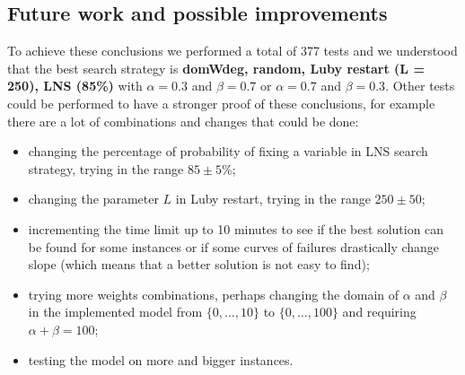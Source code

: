 \documentclass[../main.tex]{subfiles}
\begin{document}
\subsection{Future work and possible improvements}
To achieve these conclusions we performed a total of 377 tests and we understood that the best search strategy is \textbf{domWdeg, random, Luby restart (L = 250), LNS (85\%)} with $\alpha = 0.3$ and $\beta = 0.7$ or $\alpha = 0.7$ and $\beta = 0.3$. Other tests could be performed to have a stronger proof of these conclusions, for example there are a lot of combinations and changes that could be done:
\begin{itemize}
    \item changing the percentage of probability of fixing a variable in LNS search strategy, trying in the range $85 \pm 5$\%;
    \item changing the parameter $L$ in Luby restart, trying in the range $250 \pm 50$; 
    \item incrementing the time limit up to 10 minutes to see if the best solution can be found for some instances or if some curves of failures drastically change slope (which means that a better solution is not easy to find);
    \item trying more weights combinations, perhaps changing the domain of $\alpha$ and $\beta$ in the implemented model from $\{0, \dots, 10\}$ to $\{0, \dots, 100\}$ and requiring $\alpha + \beta = 100$;
    \item testing the model on more and bigger instances. 
\end{itemize}
\end{document}
